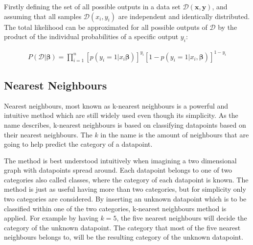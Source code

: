 \documentclass[../main.tex]{subfiles}
\begin{document}
Firstly defining the set of all possible outputs in a data set \ensuremath{\mathcal{D}(\boldsymbol x,\boldsymbol y)}, and assuming that all samples \ensuremath{\mathcal{D}(x_i,y_i)} are independent and identically distributed. The total likelihood can be approximated for all possible outputs of \ensuremath{\mathcal{D}} by the product of the individual probabilities \cite[p.~120]{HastieTrevor2009EoSL} of a specific output $y_i$:

\begin{align}
    P(\mathcal{D}|\boldsymbol{\beta}) = \prod_{i=1}^n[p(y_i=1|x_i\boldsymbol{\beta})]^{y_i}[1-p(y_i=1|x_i,\boldsymbol{\beta})]^{1-y_i}
    \label{eq:likelihood}
\end{align}

\subsection{Nearest Neighbours}
\label{sec:knn}
Nearest neighbours, most known as k-nearest neighbours is a powerful and intuitive method which are still widely used even though its simplicity. As the name describes, k-nearest neighbours is based on classifying datapoints based on their nearest neighbours. The $k$ in the name is the amount of neighbours that are going to help predict the category of a datapoint. 

The method is best understood intuitively when imagining a two dimensional graph with datapoints spread around. Each datapoint belongs to one of two categories also called classes, where the category of each datapoint is known. The method is just as useful having more than two categories, but for simplicity only two categories are considered. By inserting an unknown datapoint which is to be classified within one of the two categories, k-nearest neighbours method is applied. For example by having $k=5$, the five nearest neighbours will decide the category of the unknown datapoint. The category that most of the five nearest neighbours belongs to, will be the resulting category of the unknown datapoint.
\end{document}
